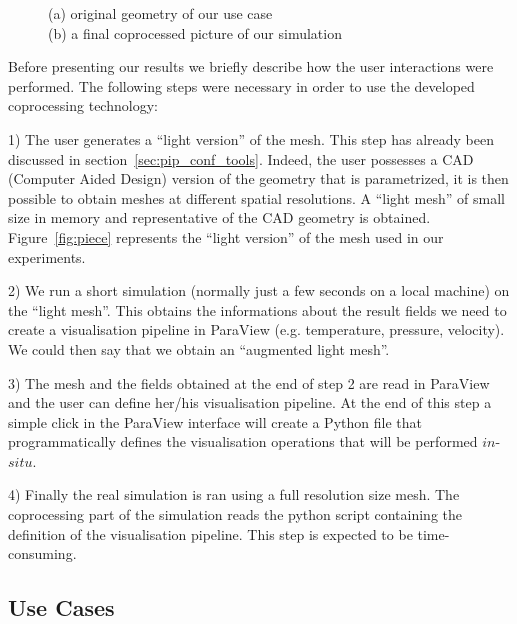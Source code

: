 \begin{figure}
\begin{subfigure}[b]{0.45\textwidth}
    \label{fig:res}
  \end{subfigure}
  \caption{(a) original geometry of our use case\\
  \hspace{8em}(b)  a final coprocessed picture of our simulation}
\end{figure}

Before presenting our results we briefly describe how the user interactions were
performed. The following steps were necessary in order to use the developed
coprocessing technology:


1) The user generates a ``light version'' of the mesh. This step has already been
discussed in section~\ref{sec:pip_conf_tools}. Indeed, the user possesses a CAD (Computer Aided
Design) version of the geometry that is parametrized, it is then possible to
obtain meshes at different spatial resolutions. A ``light mesh'' of small size in
memory and representative of the CAD geometry is obtained. Figure~\ref{fig:piece} represents
the ``light version'' of the mesh used in our experiments.


2) We run a short simulation (normally just a few seconds on a local machine) on the ``light mesh''.
This obtains the informations about the result fields we need to create a
visualisation pipeline in ParaView (e.g. temperature, pressure, velocity). We
could then say that we obtain an ``augmented light mesh''.


3) The mesh and the fields obtained at the end of step 2 are read in ParaView
and the user can define her/his visualisation pipeline. At the end of this step
a simple click in the ParaView interface will create a Python file that
programmatically defines the visualisation operations that will be performed
$in$-$situ$.


4) Finally the real simulation is ran using a full resolution size mesh. The
coprocessing part of the simulation reads the python script containing the
definition of the visualisation pipeline. This step is expected to be
time-consuming.

\subsection{Use Cases}


